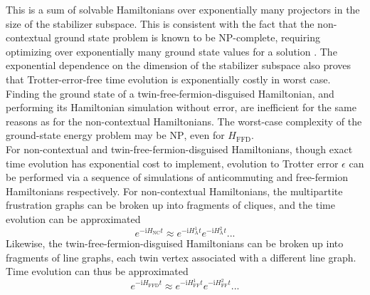 \documentclass[%
 aip,
 amsmath,amssymb,
 reprint,%
]{revtex4-1}
\newcommand{\anticommutingHamiltonian}{H_{\mathrm{A}}}
\newcommand{\noncontextualHamiltonian}{H_{\mathrm{NC}}}
\newcommand{\lineGraphFreeFermionHamiltonian}{H_{\mathrm{FF}}}
\newcommand{\freeFermionHamiltonian}{H_{\mathrm{FFD}}}
\begin{document}
\indent This is a sum of solvable Hamiltonians over exponentially many projectors in the size of the stabilizer subspace. This is consistent with the fact that the non-contextual ground state problem is known to be $\mathrm{NP}$-complete, requiring optimizing over exponentially many ground state values for a solution \cite{Kirby_ContextClassic, Ralli_ContextPauli}. The exponential dependence on the dimension of the stabilizer subspace also proves that Trotter-error-free time evolution is exponentially costly in worst case. \\
\indent Finding the ground state of a twin-free-fermion-disguised Hamiltonian, and performing its Hamiltonian simulation without error, are inefficient for the same reasons as for the non-contextual Hamiltonians. 
The worst-case complexity of the ground-state energy problem may be $\mathrm{NP}$, even for $\freeFermionHamiltonian$.\\
\indent For non-contextual and twin-free-fermion-disguised Hamiltonians, though exact time evolution has exponential cost to implement, evolution to Trotter error $\epsilon$ can be performed via a sequence of simulations of anticommuting and free-fermion Hamiltonians respectively. For non-contextual Hamiltonians, the multipartite frustration graphs can be broken up into fragments of cliques, and the time evolution can be approximated
\begin{equation}
    e^{-\mathrm{i} \noncontextualHamiltonian t} \approx e^{-\mathrm{i} \anticommutingHamiltonian^1 t} e^{-\mathrm{i} \anticommutingHamiltonian^2 t}...
    \label{eq:noncontextual-product-formula}
\end{equation}
Likewise, the twin-free-fermion-disguised Hamiltonians can be broken up into fragments of line graphs, each twin vertex associated with a different line graph. Time evolution can thus be approximated 
\begin{equation}
    e^{-\mathrm{i} \freeFermionHamiltonian t} \approx e^{-\mathrm{i} \lineGraphFreeFermionHamiltonian^1 t} e^{-\mathrm{i} \lineGraphFreeFermionHamiltonian^2 t}...
    \label{eq:free-fermion-product-formula}
\end{equation}
\end{document}
